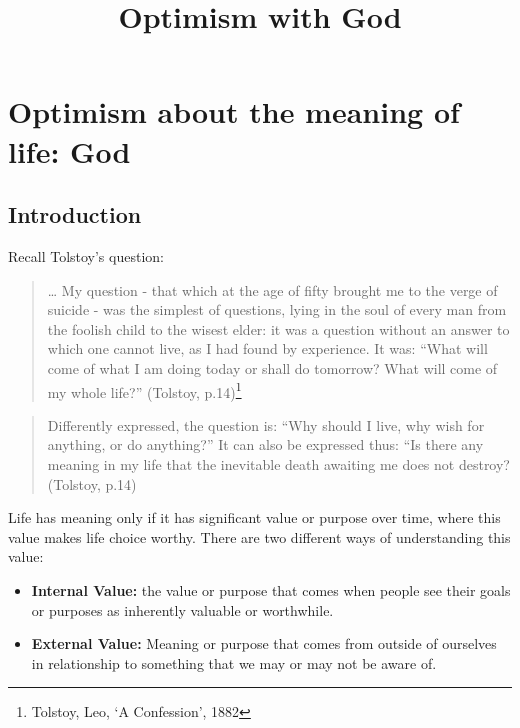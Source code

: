 \documentclass[]{article}
\title{Optimism with God}
\date{}
\begin{document}
\maketitle

\section{Optimism about the meaning of life:
God}\label{optimism-about-the-meaning-of-life-god}

\subsection{Introduction}\label{introduction}

Recall Tolstoy's question:

\begin{quote}
\ldots{} My question - that which at the age of fifty brought me to the
verge of suicide - was the simplest of questions, lying in the soul of
every man from the foolish child to the wisest elder: it was a question
without an answer to which one cannot live, as I had found by
experience. It was: ``What will come of what I am doing today or shall
do tomorrow? What will come of my whole life?'' (Tolstoy,
p.14)\footnote{Tolstoy, Leo, `A Confession', 1882}
\end{quote}

\begin{quote}
Differently expressed, the question is: ``Why should I live, why wish
for anything, or do anything?'' It can also be expressed thus: ``Is
there any meaning in my life that the inevitable death awaiting me does
not destroy? (Tolstoy, p.14)
\end{quote}

Life has meaning only if it has significant value or purpose over time,
where this value makes life choice worthy. There are two different ways
of understanding this value:

\begin{itemize}
\item
  \textbf{Internal Value:} the value or purpose that comes when people
  see their goals or purposes as inherently valuable or worthwhile.
\item
  \textbf{External Value:} Meaning or purpose that comes from outside of
  ourselves in relationship to something that we may or may not be aware
  of.
\end{itemize}
\end{document}
